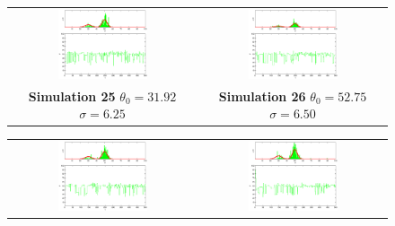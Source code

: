 \begin{figure}\label{fig: SimulationMetropolis3}
\begin{tabular}{cc} 
\includegraphics[width=0.5\textwidth]{ImaginiLatex/MetropolisExample25.eps} &
\includegraphics[width=0.5\textwidth]{ImaginiLatex/MetropolisExample26.eps} \\
\textbf{Simulation 25} $\theta_0=   31.92$  $\sigma=    6.25$  & \textbf{Simulation 26} $\theta_0=   52.75$  $\sigma=    6.50$
\end{tabular}
\begin{tabular}{cc} 
\includegraphics[width=0.5\textwidth]{ImaginiLatex/MetropolisExample27.eps} &
\includegraphics[width=0.5\textwidth]{ImaginiLatex/MetropolisExample28.eps} \\

\end{tabular}
\end{figure}
